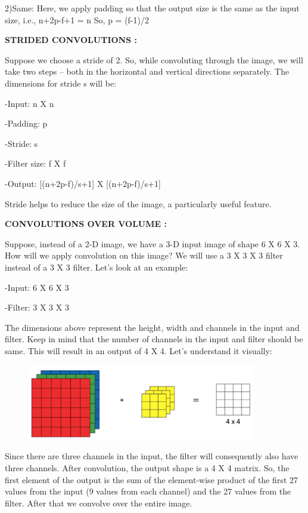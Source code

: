 \documentclass[a4paper]{article}
\begin{document}
    2)Same: Here, we apply padding so that the output size is the same as the input size, i.e.,
    n+2p-f+1 = n
    So, p = (f-1)/2
    
    
    
  
 \textbf{ STRIDED CONVOLUTIONS :}
  
  Suppose we choose a stride of 2. So, while convoluting through the image, we will take two steps – both in the horizontal and vertical directions separately. The dimensions for stride s will be: 
 
    -Input: n X n
    
    -Padding: p
    
    -Stride: s
    
    -Filter size: f X f
    
    -Output: [(n+2p-f)/s+1] X [(n+2p-f)/s+1]

Stride helps to reduce the size of the image, a particularly useful feature. 

\clearpage


\textbf{CONVOLUTIONS OVER VOLUME :}

Suppose, instead of a 2-D image, we have a 3-D input image of shape 6 X 6 X 3. How will we apply convolution on this image? We will use a 3 X 3 X 3 filter instead of a 3 X 3 filter. Let’s look at an example:

    -Input: 6 X 6 X 3
    
    -Filter: 3 X 3 X 3

The dimensions above represent the height, width and channels in the input and filter. Keep in mind that the number of channels in the input and filter should be same. This will result in an output of 4 X 4. Let’s understand it visually: 

{
\begin{figure}[htp]
    \centering
    \includegraphics[width=10cm]{C_Volume.png}
\end{figure}
}

Since there are three channels in the input, the filter will consequently also have three channels. After convolution, the output shape is a 4 X 4 matrix. So, the first element of the output is the sum of the element-wise product of the first 27 values from the input (9 values from each channel) and the 27 values from the filter. After that we convolve over the entire image. 
\end{document}
